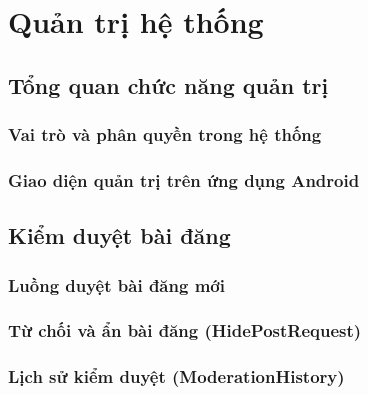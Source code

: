 
\chapter{Quản trị hệ thống}

\section{Tổng quan chức năng quản trị}

\subsection{Vai trò và phân quyền trong hệ thống}


\subsection{Giao diện quản trị trên ứng dụng Android}


\section{Kiểm duyệt bài đăng}

\subsection{Luồng duyệt bài đăng mới}


\subsection{Từ chối và ẩn bài đăng (HidePostRequest)}


\subsection{Lịch sử kiểm duyệt (ModerationHistory)}


